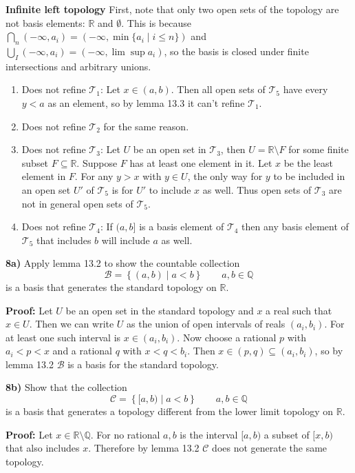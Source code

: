 \documentclass[paper=a4, fontsize=11pt]{scrartcl} %
\newcommand{\script}{\mathcal}
\numberwithin{equation}{section}    %
\numberwithin{figure}{section}      %
\numberwithin{table}{section}       %
\begin{document}
\textbf {Infinite left topology}
First, note that only two open sets of the topology are not basis elements:
$\mathbb R$ and $\emptyset$. This is because $\bigcap_n (-\infty, a_i) =
(-\infty, \min \{ a_i \mid i \le n \})$ and $\bigcup_I (-\infty, a_i) =
(-\infty, \lim \sup a_i)$, so the basis is closed under finite intersections
and arbitrary unions.
\begin{enumerate}
  \item Does not refine $\script T_1$: Let $x \in (a, b)$. Then all open sets of
    $\script T_5$ have every $y < a$ as an element, so by lemma 13.3 it can't
    refine $\script T_1$.
  \item Does not refine $\script T_2$ for the same reason.
  \item Does not refine $\script T_3$: Let $U$ be an open set in $\script T_3$,
    then $U = \mathbb R \setminus F$ for some finite subset $F \subseteq \mathbb R$.
    Suppose $F$ has at least one element in it. Let $x$ be the least element in
    $F$. For any $y > x$ with $y \in U$, the only way for $y$ to be included
    in an open set $U'$ of $\script T_5$ is for $U'$ to include $x$ as well.
    Thus open sets of $\script T_3$ are not in general open sets of $\script T_5$.
  \item Does not refine $\script T_4$: If $(a, b]$ is a basis element of
    $\script T_4$ then any basis element of $\script T_5$ that includes $b$ will
    include $a$ as well.
\end{enumerate}

\hrulefill

\textbf {8a)} Apply lemma 13.2 to show the countable collection
\[ \script B = \left\{(a, b) \mid a < b \right\} \qquad a, b \in \mathbb Q \]
is a basis that generates the standard topology on $\mathbb R$.

\textbf {Proof:} Let $U$ be an open set in the standard topology and $x$ a real
such that $x \in U$. Then we can write $U$ as the union of open intervals of
reals $(a_i, b_i)$. For at least one such interval is $x \in (a_i, b_i)$.
Now choose a rational $p$ with $a_i < p < x$ and a rational $q$ with
$x < q < b_i$. Then $x \in (p, q) \subseteq (a_i, b_i)$, so by lemma 13.2
$\script B$ is a basis for the standard topology.

\textbf {8b)} Show that the collection
\[ \script C = \left\{[a,b) \mid a < b \right\} \qquad a, b \in \mathbb Q \]
is a basis that generates a topology different from the lower limit topology on
$\mathbb R$.

\textbf {Proof:} Let $x \in \mathbb R \setminus \mathbb Q$. For no rational $a, b$
is the interval $[a, b)$ a subset of $[x, b)$ that also includes $x$. Therefore
by lemma 13.2 $\script C$ does not generate the same topology.

\end{document}
